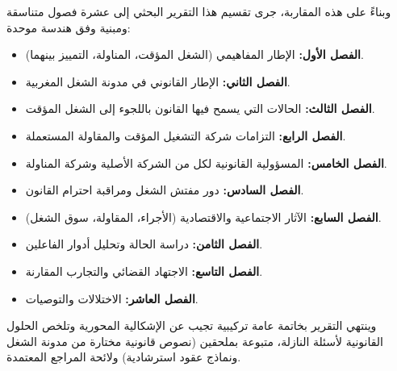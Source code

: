 وبناءً على هذه المقاربة، جرى تقسيم هذا التقرير البحثي إلى عشرة فصول متناسقة ومبنية وفق هندسة موحدة:
\begin{itemize}
    \item \textbf{الفصل الأول:} الإطار المفاهيمي (الشغل المؤقت، المناولة، التمييز بينهما).
    \item \textbf{الفصل الثاني:} الإطار القانوني في مدونة الشغل المغربية.
    \item \textbf{الفصل الثالث:} الحالات التي يسمح فيها القانون باللجوء إلى الشغل المؤقت.
    \item \textbf{الفصل الرابع:} التزامات شركة التشغيل المؤقت والمقاولة المستعملة.
    \item \textbf{الفصل الخامس:} المسؤولية القانونية لكل من الشركة الأصلية وشركة المناولة.
    \item \textbf{الفصل السادس:} دور مفتش الشغل ومراقبة احترام القانون.
    \item \textbf{الفصل السابع:} الآثار الاجتماعية والاقتصادية (الأجراء، المقاولة، سوق الشغل).
    \item \textbf{الفصل الثامن:} دراسة الحالة وتحليل أدوار الفاعلين.
    \item \textbf{الفصل التاسع:} الاجتهاد القضائي والتجارب المقارنة.
    \item \textbf{الفصل العاشر:} الاختلالات والتوصيات.
\end{itemize}

وينتهي التقرير بخاتمة عامة تركيبية تجيب عن الإشكالية المحورية وتلخص الحلول القانونية لأسئلة النازلة، متبوعة بملحقين (نصوص قانونية مختارة من مدونة الشغل ونماذج عقود استرشادية) ولائحة المراجع المعتمدة.